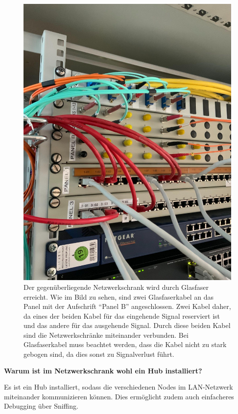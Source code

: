 \begin{figure}
\centering
\includegraphics{./static/patch_panel.jpeg}
\caption{Der gegenüberliegende Netzwerkschrank wird durch Glasfaser
erreicht. Wie im Bild zu sehen, sind zwei Glasfaserkabel an das Panel
mit der Aufschrift ``Panel B'' angeschlossen. Zwei Kabel daher, da eines
der beiden Kabel für das eingehende Signal reserviert ist und das andere
für das ausgehende Signal. Durch diese beiden Kabel sind die
Netzwerkschränke miteinander verbunden. Bei Glasfaserkabel muss beachtet
werden, dass die Kabel nicht zu stark gebogen sind, da dies sonst zu
Signalverlust führt.}
\end{figure}

\textbf{Warum ist im Netzwerkschrank wohl ein Hub installiert?}

Es ist ein Hub installiert, sodass die verschiedenen Nodes im
LAN-Netzwerk miteinander kommunizieren können. Dies ermöglicht zudem
auch einfacheres Debugging über Sniffing.


